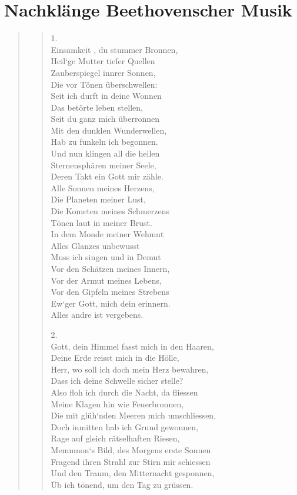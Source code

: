 \documentclass[10pt,titlepage,a5paper]{book}
\newenvironment{tg}{\begin{quote}\em}{\end{quote}}
\begin{document}
\section*{Nachklänge Beethovenscher Musik}


\begin{tg}
\begin{verse}
1.\\
Einsamkeit , du stummer Bronnen,\\
Heil`ge Mutter  tiefer Quellen\\
Zauberspiegel innrer Sonnen, \\
Die vor Tönen überschwellen:\\
Seit ich durft in deine Wonnen\\
Das betörte leben stellen,\\
Seit du ganz mich überronnen\\
Mit den dunklen Wunderwellen,\\
Hab zu funkeln ich begonnen.\\
Und nun klingen all die hellen\\
Sternensphären meiner Seele,\\
Deren Takt ein Gott mir zähle.\\
Alle Sonnen meines Herzens,\\
Die Planeten meiner Lust,\\
Die Kometen meines Schmerzens\\
Tönen laut in meiner Brust.\\
In dem Monde meiner Wehmut\\
Alles Glanzes unbewusst\\
Muss ich singen und in Demut\\
Vor den Schätzen meines Innern,\\
Vor der Armut meines Lebens,\\
Vor den Gipfeln meines Strebens\\
Ew`ger Gott, mich dein erinnern.\\
Alles andre ist vergebens.

2.\\
Gott, dein Himmel fasst mich in den Haaren,\\
Deine Erde reisst mich in die Hölle,\\
Herr, wo soll ich doch mein Herz bewahren,\\
Dass ich deine Schwelle sicher stelle?\\
Also floh ich durch die Nacht, da fliessen\\
Meine Klagen hin wie Feuerbronnen,\\
Die mit glüh`nden Meeren mich umschliessen,\\
Doch inmitten hab ich Grund gewonnen,\\
Rage auf gleich rätselhaften Riesen,\\
Memmnon`s Bild, des Morgens erste Sonnen\\
Fragend ihren Strahl zur Stirn mir schiessen\\
Und den Traum, den Mitternacht gesponnen,\\
Üb ich tönend, um den Tag zu grüssen.


\end{verse}
\end{tg}
\end{document}
